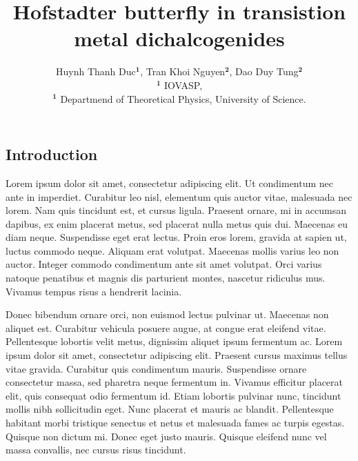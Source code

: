 \documentclass[superscriptaddress,a0]{sciposter}
\title{Hofstadter butterfly in transistion metal dichalcogenides}
\author{Huynh Thanh Duc$\mathbf{^1}$, Tran Khoi Nguyen$\mathbf{^2}$, Dao Duy Tung$\mathbf{^2}$ \\ 
\small $\mathbf{^1}$ IOVASP, \\ 
\small $\mathbf{^1}$ Departmend of Theoretical Physics, University of Science.
}
\institute 
{The 50th Vietnam Conference on Theoretical Physics}
\begin{document}

\maketitle

\newcommand{\mycaption}{%
\ifx \@captype \@undefined \@latex@error {\noexpand \caption outside float}\@ehd \expandafter \@gobble \else \refstepcounter \@captype \expandafter \@firstofone \fi {\@dblarg {\@caption \@captype }}%
}%

\begin{multicols}{3}


\section{Introduction}


Lorem ipsum dolor sit amet, consectetur adipiscing elit. Ut condimentum nec ante in imperdiet. Curabitur leo nisl, elementum quis auctor vitae, malesuada nec lorem. Nam quis tincidunt est, et cursus ligula. Praesent ornare, mi in accumsan dapibus, ex enim placerat metus, sed placerat nulla metus quis dui. Maecenas eu diam neque. Suspendisse eget erat lectus. Proin eros lorem, gravida at sapien ut, luctus commodo neque. Aliquam erat volutpat. Maecenas mollis varius leo non auctor. Integer commodo condimentum ante sit amet volutpat. Orci varius natoque penatibus et magnis dis parturient montes, nascetur ridiculus mus. Vivamus tempus risus a hendrerit lacinia.

Donec bibendum ornare orci, non euismod lectus pulvinar ut. Maecenas non aliquet est. Curabitur vehicula posuere augue, at congue erat eleifend vitae. Pellentesque lobortis velit metus, dignissim aliquet ipsum fermentum ac. Lorem ipsum dolor sit amet, consectetur adipiscing elit. Praesent cursus maximus tellus vitae gravida. Curabitur quis condimentum mauris. Suspendisse ornare consectetur massa, sed pharetra neque fermentum in. Vivamus efficitur placerat elit, quis consequat odio fermentum id. Etiam lobortis pulvinar nunc, tincidunt mollis nibh sollicitudin eget. Nunc placerat et mauris ac blandit. Pellentesque habitant morbi tristique senectus et netus et malesuada fames ac turpis egestas. Quisque non dictum mi. Donec eget justo mauris. Quisque eleifend nunc vel massa convallis, nec cursus risus tincidunt.


\end{multicols}
\end{document}
